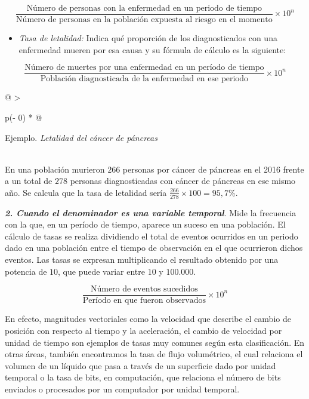 \documentclass[
  11pt,
]{book}
\providecommand{\tightlist}{%
  \setlength{\itemsep}{0pt}\setlength{\parskip}{0pt}}
\begin{document}
\[\begin{equation}
\frac{\text{Número de personas con la enfermedad en un periodo de tiempo}}{\text{Número de personas en la población expuesta al riesgo
en el momento}}\times 10^{n}
\end{equation}\]

\begin{itemize}
\tightlist
\item
  \emph{Tasa de letalidad:} Indica qué proporción de los diagnosticados con una enfermedad mueren por esa causa y su fórmula de cálculo es la siguiente:
\end{itemize}

\[\begin{equation}
\frac{\text{Número de muertes por una enfermedad en un período de tiempo}}{\text{Población diagnosticada de la enfermedad en ese periodo}}\times 10^n
\end{equation}\]

\begin{longtable}[]{@{}
  >{\raggedright\arraybackslash}p{(\columnwidth - 0\tabcolsep) * }@{}}
\toprule
\begin{minipage}[b]{\linewidth}\raggedright
Ejemplo. \emph{Letalidad del cáncer de páncreas}
\end{minipage} \\
\midrule
\endhead
En una población murieron \(266\) personas por cáncer de páncreas en el 2016 frente a un total de \(278\) personas diagnosticadas con cáncer de páncreas en ese mismo año. Se calcula que la tasa de letalidad sería \(\frac{266}{278}\times 100=95,7\%\). \\
\bottomrule
\end{longtable}

\textbf{\emph{2. Cuando el denominador es una variable temporal}}. Mide la frecuencia con la que, en un período de tiempo, aparece un suceso en una población. El cálculo de tasas se realiza dividiendo el total de eventos ocurridos en un periodo dado en una población entre el tiempo de observación en el que ocurrieron dichos eventos. Las tasas se expresan multiplicando el resultado obtenido por una potencia de \(10\), que puede variar entre \(10\) y \(100.000\).

\[\begin{equation}
\frac{\text{Número de eventos sucedidos}}{\text{Período en que fueron observados}}\times 10^{n}
\end{equation}\]

En efecto, magnitudes vectoriales como la velocidad que describe el cambio de posición con respecto al tiempo y la aceleración, el cambio de velocidad por unidad de tiempo son ejemplos de tasas muy comunes según esta clasificación. En otras áreas, también encontramos la tasa de flujo volumétrico, el cual relaciona el volumen de un líquido que pasa a través de un superficie dado por unidad temporal o la tasa de bits, en computación, que relaciona el número de bits enviados o procesados por un computador por unidad temporal.
\end{document}
